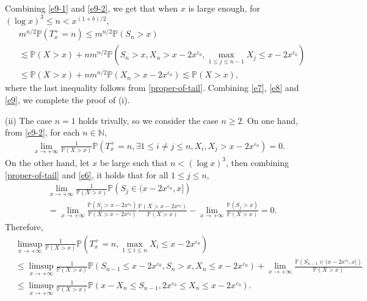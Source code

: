 \documentclass[11pt]{article}
\numberwithin{equation}{section}
\begin{document}
Combining \eqref{e9-1} and \eqref{e9-2}, we get that when $x$ is large enough, for $(\log x)^3\leq n< x^{(1+b)/2}$,
\begin{align}\label{e9}
	& m^{n/2}\mathbb{P}(T_x^+=n) \leq m^{n/2} \mathbb{P}(S_n>x) \nonumber\\
	&\lesssim   \mathbb{P}(X>x)   + n m^{n/2} \mathbb{P}\left(S_n>x, X_n>x-2x^{\varepsilon_0}, \max_{1\leq j\leq n-1} X_j\leq x-2x^{\varepsilon_0}\right) \nonumber\\
	&\leq    \mathbb{P}(X>x)  + n m^{n/2} \mathbb{P}\left( X_n>x-2x^{\varepsilon_0} \right) \lesssim   \mathbb{P}(X>x)  ,
\end{align}
where the last inequality follows from \eqref{proper-of-tail}.  Combining \eqref{e7}, \eqref{e8} and \eqref{e9}, we complete the proof of (i).

(ii) The case $n=1$ holds trivally, so we consider the case $n\geq 2$. On one hand, from \eqref{e9-2},   for each $n\in \mathbb{N}$,
\begin{align}\label{e11-1}
	\lim_{x\to+\infty} \frac{1}{\mathbb{P}(X>x)}\mathbb{P}\left(T_x^+=n, \exists 1\leq  i\neq j\leq n, X_i, X_j > x-2x^{\varepsilon_0} \right) =0. 
\end{align}
On the other hand, let $x$ be large such that $n< (\log x)^3$, then combining \eqref{proper-of-tail} and \eqref{e6},  it holds that for all $1\leq j\leq n$,
\begin{align}
 	& \lim_{x\to+\infty} \frac{1}{\mathbb{P}(X>x)} \mathbb{P}\left(S_j\in (x-2x^{\varepsilon_0}, x] \right) \nonumber\\
 	&= \lim_{x\to+\infty} \frac{\mathbb{P}\left(S_j> x-2x^{\varepsilon_0} \right)}{\mathbb{P}(X>x-2x^{\varepsilon_0})} \frac{\mathbb{P}\left(X> x-2x^{\varepsilon_0} \right)}{\mathbb{P}(X>x)} -\lim_{x\to+\infty} \frac{\mathbb{P}\left(S_j>x \right)}{\mathbb{P}(X>x)} =0.
\end{align}
Therefore,
\begin{align}
	& \limsup_{x\to+\infty} \frac{1}{\mathbb{P}(X>x)}\mathbb{P}\left(T_x^+=n, \max_{1\leq i\leq n} X_i \leq x-2x^{\varepsilon_0}\right) \nonumber\\
	& \leq  \limsup_{x\to+\infty} \frac{1}{\mathbb{P}(X>x)} \mathbb{P}\left(S_{n-1} \leq x-2x^{\varepsilon_0}, S_n> x,  X_n \leq x-2x^{\varepsilon_0}\right) + \lim_{x\to+\infty} \frac{\mathbb{P}\left(S_{n-1}\in (x-2x^{\varepsilon_0}, x] \right)}{\mathbb{P}(X>x)} \nonumber\\
	& \leq \limsup_{x\to+\infty} \frac{1}{\mathbb{P}(X>x)}\mathbb{P}\left(x-X_n\leq  S_{n-1},  2x^{\varepsilon_0}\leq X_n \leq x-2x^{\varepsilon_0}\right).
\end{align}
\end{document}
